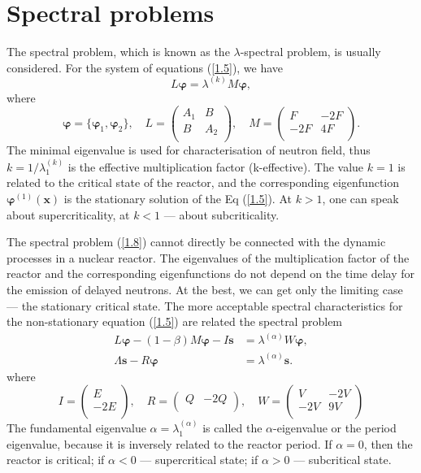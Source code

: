 \documentclass[a4paper]{jpconf}
\begin{document}
\section{Spectral problems}
The spectral problem, which is known as the $\lambda$-spectral problem, is usually considered.
For the system of equations (\ref{1.5}), we have
\begin{equation}\label{1.8}
L \bm \varphi = \lambda^{(k)} M \bm \varphi,
\end{equation}
where
\[
\bm \varphi = \{\bm \varphi_1, \bm \varphi_2\},
\quad
L = \begin{pmatrix}
A_1 & B \\
B & A_2 \\
\end{pmatrix},
\quad
M = \begin{pmatrix}
F & -2F \\
-2F & 4F \\
\end{pmatrix}.
\]
The minimal eigenvalue is used for characterisation of neutron field, thus $k = 1 /\lambda^{(k)}_1$ is the effective multiplication factor (k-effective).
The value $k = 1$ is related to the critical state of the reactor, and the corresponding eigenfunction $\bm{\varphi}^{(1)}(\bm x)$ is the stationary solution of the Eq (\ref{1.5}).
At $k > 1$, one can speak about supercriticality, at $k < 1$ --- about subcriticality.

The spectral problem (\ref{1.8}) cannot directly be connected with the
dynamic processes in a nuclear reactor. The eigenvalues of the multiplication factor of the reactor and the corresponding eigenfunctions do not depend on the time delay for the emission of delayed neutrons. 
At the best, we can get only the limiting case --- the stationary critical state.
The more acceptable spectral characteristics for the non-stationary equation (\ref{1.5}) are related the spectral problem
\begin{equation}\label{1.9}
\begin{split}
L \bm \varphi - (1 - \beta) M \bm \varphi - I \bm s &= \lambda^{(\alpha)} W \bm \varphi, \\
\Lambda \bm s - R \bm \varphi  &= \lambda^{(\alpha)} \bm s.
\end{split}
\end{equation}
where
\[
I = \begin{pmatrix}
E \\
-2E \\
\end{pmatrix},
\quad
R = \begin{pmatrix}
Q & -2Q \\
\end{pmatrix},
\quad
W = \begin{pmatrix}
V & -2V \\
-2V & 9V \\
\end{pmatrix}
\]
The fundamental eigenvalue $\alpha = \lambda^{(\alpha)}_1$ is called the $\alpha$-eigenvalue or the period eigenvalue, because it is inversely related to the reactor period. If $\alpha = 0$, then the reactor is critical; if $\alpha < 0$ --- supercritical state; if $\alpha > 0$ --- subcritical state.
\end{document}
